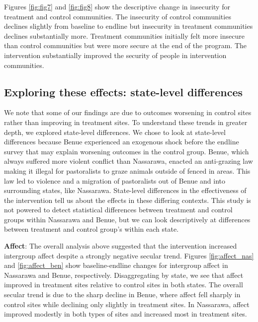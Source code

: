 \documentclass[11pt]{article}
\begin{document}
Figures \ref{fig:fig7} and \ref{fig:fig8} show the descriptive change in
insecurity for treatment and control communities. The insecurity of
control communities declines slightly from baseline to endline but
insecurity in treatment communities declines substantially more.
Treatment communities initially felt more insecure than control
communities but were more secure at the end of the program. The
intervention substantially improved the security of people in
intervention communities.

\hypertarget{exploring-these-effects-state-level-differences}{%
\subsection{Exploring these effects: state-level
differences}\label{exploring-these-effects-state-level-differences}}

We note that some of our findings are due to outcomes worsening in
control sites rather than improving in treatment sites. To understand
these trends in greater depth, we explored state-level differences. We
chose to look at state-level differences because Benue experienced an
exogenous shock before the endline survey that may explain worsening
outcomes in the control group. Benue, which always suffered more violent
conflict than Nassarawa, enacted an anti-grazing law making it illegal
for pastoralists to graze animals outside of fenced in areas. This law
led to violence and a migration of pastoralists out of Benue and into
surrounding states, like Nassarawa. State-level differences in the
effectiveness of the intervention tell us about the effects in these
differing contexts. This study is not powered to detect statistical
differences between treatment and control groups within Nassarawa and
Benue, but we can look descriptively at differences between treatment
and control group's within each state.

\textbf{Affect}: The overall analysis above suggested that the
intervention increased intergroup affect despite a strongly negative
secular trend. Figures \ref{fig:affect_nas} and \ref{fig:affect_ben}
show baseline-endline changes for intergroup affect in Nassarawa and
Benue, respectively. Disaggregating by state, we see that affect
improved in treatment sites relative to control sites in both states.
The overall secular trend is due to the sharp decline in Benue, where
affect fell sharply in control sites while declining only slightly in
treatment sites. In Nassarawa, affect improved modestly in both types of
sites and increased most in treatment sites.
\end{document}
